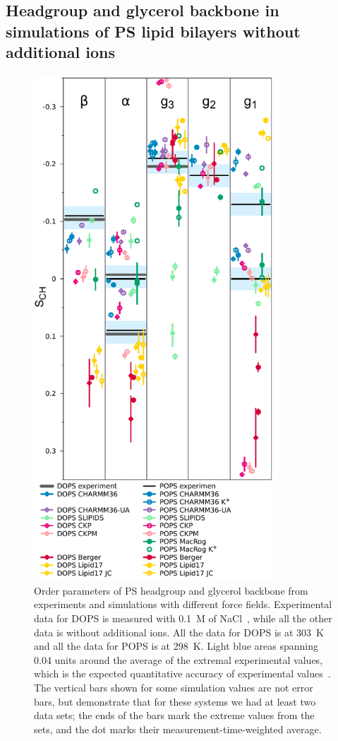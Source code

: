 \documentclass[aps,prl,superscriptaddress,twocolumn]{revtex4}
\begin{document}
\subsection{Headgroup and glycerol backbone in simulations of PS lipid bilayers without additional ions}
\begin{figure}[]
  \centering
  \includegraphics[width=9.0cm]{../Figs/HGorderparametersPS.pdf}
  \caption{\label{HGorderParametersPS}
    Order parameters of PS headgroup and glycerol backbone from experiments
    and simulations with different force fields.
    Experimental data for DOPS is measured with 0.1~M of NaCl~\cite{browning80},
    while all the other data is without additional ions.
    All the data for DOPS is at 303~K and all the data for POPS is at 298~K.
    Light blue areas spanning 0.04 units around the average of the extremal experimental values,
    which is the expected quantitative accuracy of experimental values~\cite{ollila16}.
    The vertical bars shown for some simulation values
    are not error bars, but demonstrate that for these systems
    we had at least two data sets; the ends of the bars mark the extreme values
    from the sets, and the dot marks their measurement-time-weighted average.
  }
\end{figure}
\end{document}
